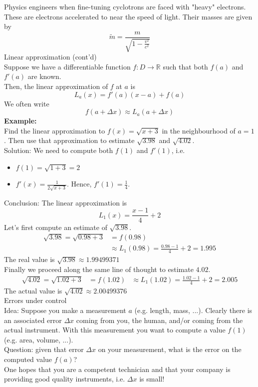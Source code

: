 \documentclass[]{article}
\begin{document}
	Physics engineers when fine-tuning cyclotrons are faced with "heavy" electrons. These are electrons accelerated to near the speed of light. Their masses are given by
	$$
		\tilde{m}=\frac{m}{\sqrt{1-\frac{v^2}{c^2}}}
	$$
	\large{Linear approximation (cont'd)}\\
	\normalsize
	Suppose we have a differentiable function $f:D\rightarrow\mathbb{R}$ such that both $f(a)$ and $f'(a)$ are known.\\
	Then, the linear approximation of $f$ at $a$ is
	$$
		L_a(x)=f'(a)(x-a)+f(a)
	$$
	We often write
	$$
		f(a+\Delta x)\approx L_a(a+\Delta x)
	$$
	{\bf Example:}\\
	Find the linear approximation to $f(x)=\sqrt{x+3}$ in the neighbourhood of $a=1$. Then use that approximation to estimate $\sqrt{3.98}$ and $\sqrt{4.02}$.\\
	Solution: We need to compute both $f(1)$ and $f'(1)$, i.e.
	\begin{itemize}
		\item $f(1)=\sqrt{1+3}=2$
		\item $f'(x)=\frac{1}{2\sqrt{x+3}}$. Hence, $f'(1)=\frac{1}{4}$.
	\end{itemize}
	Conclusion: The linear approximation is
	$$
		L_1(x)=\frac{x-1}{4}+2
	$$
	Let's first compute an estimate of $\sqrt{3.98}$.
	\begin{align*}
		\sqrt{3.98}=\sqrt{0.98+3}&=f(0.98)\\
		&\approx L_1(0.98)=\frac{0.98-1}{4}+2=1.995
	\end{align*}
	The real value is $\sqrt{3.98}\approx 1.99499371$\\
	Finally we proceed along the same line of thought to estimate $4.02$.
	\begin{align*}
		\sqrt{4.02}=\sqrt{1.02+3}&=f(1.02)
		&\approx L_1(1.02)=\frac{1.02-1}{4}+2=2.005
	\end{align*}
	The actual value is $\sqrt{4.02}\approx 2.00499376$\\
	\large{Errors under control}\\
	Idea: Suppose you make a measurement $a$ (e.g. length, mass, ...). Clearly there is an associated error $\Delta x$ coming from you, the human, and/or coming from the actual instrument. With this measurement you want to compute a value $f(1)$ (e.g. area, volume, ...).\\
	Question: given that error $\Delta x$ on your measurement, what is the error on the computed value $f(a)$?\\
	One hopes that you are a competent technician and that your company is providing good quality instruments, i.e. $\Delta x$ is small!\\
\end{document}
